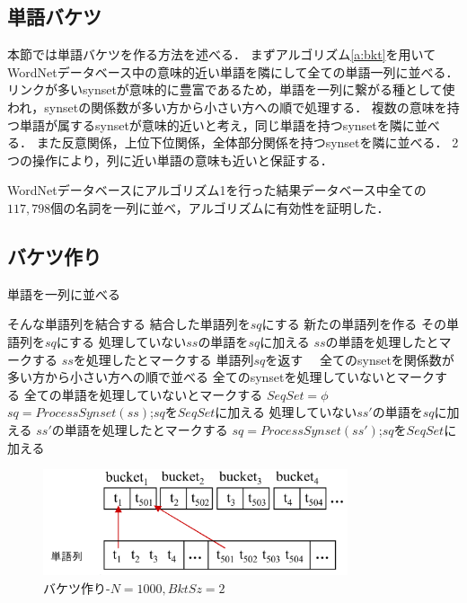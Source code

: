 \documentclass[master]{suribt}
\theoremstyle{definition}
\begin{document}
 \subsection{単語バケツ} 
 本節では単語バケツを作る方法を述べる．
 まずアルゴリズム\ref{a:bkt}を用いてWordNetデータベース中の意味的近い単語を隣にして全ての単語一列に並べる．
 リンクが多いsynsetが意味的に豊富であるため，単語を一列に繋がる種として使われ，synsetの関係数が多い方から小さい方への順で処理する．
 複数の意味を持つ単語が属するsynsetが意味的近いと考え，同じ単語を持つsynsetを隣に並べる．
 また反意関係，上位下位関係，全体部分関係を持つsynsetを隣に並べる．
 2つの操作により，列に近い単語の意味も近いと保証する．

 WordNetデータベースにアルゴリズム1を行った結果データベース中全ての$117,798$個の名詞を一列に並べ，アルゴリズムに有効性を証明した．

 \subsection{バケツ作り}
 \begin{algorithm}
 \caption{単語を一列に並べる}
 \begin{algorithmic}[1]
   \State そんな単語列を結合する
   \State 結合した単語列を$sq$にする
   \State 新たの単語列を作る
   \State その単語列を$sq$にする
  \EndIf
  \State 処理していない$ss$の単語を$sq$に加える
  \State $ss$の単語を処理したとマークする
  \State $ss$を処理したとマークする
  \State 単語列$sq$を返す　
 \EndFunction
  \State 全てのsynsetを関係数が多い方から小さい方への順で並べる
  \State 全てのsynsetを処理していないとマークする
  \State 全ての単語を処理していないとマークする
  \State $SeqSet = \phi$
   \State $sq=ProcessSynset(ss)$;$sq$を$SeqSet$に加える
    \State 処理していない$ss'$の単語を$sq$に加える
    \State $ss'$の単語を処理したとマークする
    \State $sq=ProcessSynset(ss')$;$sq$を$SeqSet$に加える　
   \EndFor
  \EndFor
 \EndFunction
 \end{algorithmic}
 \label{a:bkt}
 \end{algorithm}

 \begin{figure}[!hbp]
  \centering
  \includegraphics[width=0.8\textwidth,natwidth=5677,natheight=1982]{rk11.png}
  \caption{バケツ作り-$N=1000,BktSz=2$}\label{fig:bkt}
 \end{figure}
\end{document}
